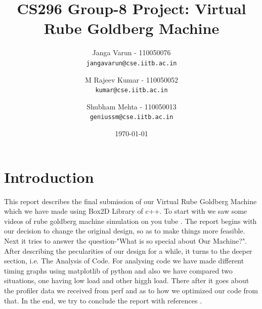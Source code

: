\documentclass[11pt]{article}
\begin{document}
\title{CS296 Group-8 Project: Virtual Rube Goldberg Machine}
\author{
		Janga Varun - 110050076\\\texttt{jangavarun@cse.iitb.ac.in} \and
		M Rajeev Kumar - 110050052\\\texttt{kumar@cse.iitb.ac.in} \and
		Shubham Mehta - 110050013\\\texttt{geniussm@cse.iitb.ac.in}
}

\date{\today}

\maketitle

\section{Introduction}
This report describes the final submission of our Virtual Rube Goldberg Machine \cite{ru} which we have made using Box2D \cite{box}Library of c++. To start with we saw some videos of rube goldberg machine simulation on you tube \cite{vid1} \cite{vid2}.
The report begins with our decision to change the original design, so as to make things more feasible. 
Next it tries to answer the question-"What is so special about Our Machine?". After describing the pecularities of our design for a while, it turns to the deeper section, i.e. The Analysis of Code. For analysing code we have made different timing graphs using matplotlib \cite{pydoc} of python \cite{pyhelp} and also we have compared two situations, one having low load and other higgh load. There after it goes about the profiler data we received from perf and as to how we optimized our code from that. In the end, we try to conclude the report with references \cite{wi} \cite{km}.
\newpage
\end{document}
